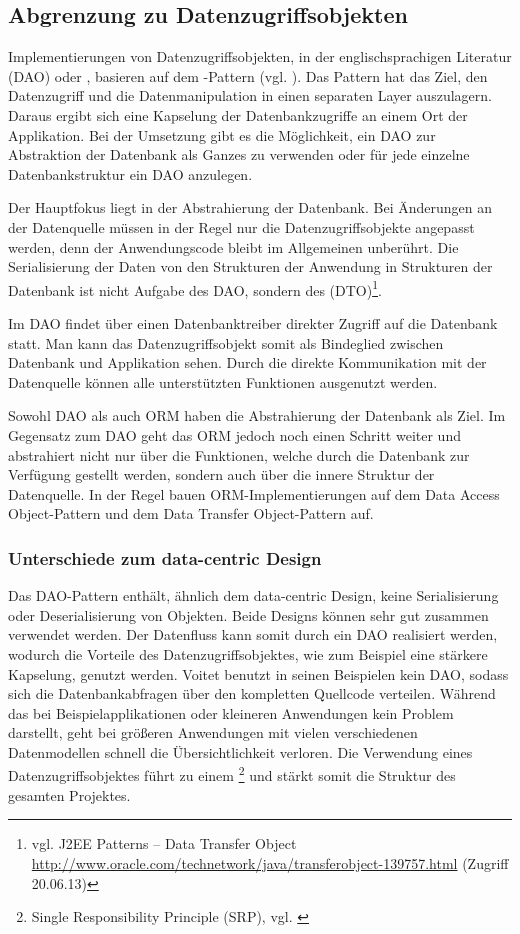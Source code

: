 \subsection{Abgrenzung zu Datenzugriffsobjekten}
Implementierungen von Datenzugriffsobjekten, in der englischsprachigen Literatur  (DAO) oder , basieren auf dem -Pattern (vgl. \cite{j2ee-pattern}).  Das Pattern hat das Ziel, den Datenzugriff und die Datenmanipulation in einen separaten Layer auszulagern. Daraus ergibt sich eine Kapselung der Datenbankzugriffe an einem Ort der Applikation. Bei der Umsetzung gibt es die Möglichkeit, ein DAO zur Abstraktion der Datenbank als Ganzes zu verwenden oder für jede einzelne Datenbankstruktur ein DAO anzulegen.

Der Hauptfokus liegt in der Abstrahierung der Datenbank. Bei Änderungen an der Datenquelle müssen in der Regel nur die Datenzugriffsobjekte angepasst werden, denn der Anwendungscode bleibt im Allgemeinen unberührt. Die Serialisierung der Daten von den Strukturen der Anwendung in Strukturen der Datenbank ist nicht Aufgabe des DAO, sondern des  (DTO)\footnote{vgl. J2EE Patterns – Data Transfer Object \url{http://www.oracle.com/technetwork/java/transferobject-139757.html} (Zugriff 20.06.13)}.

Im DAO findet über einen Datenbanktreiber direkter Zugriff auf die Datenbank statt. Man kann das Datenzugriffsobjekt somit als Bindeglied zwischen Datenbank und Applikation sehen. Durch die direkte Kommunikation mit der Datenquelle können alle unterstützten Funktionen ausgenutzt werden. 

Sowohl DAO als auch ORM haben die Abstrahierung der Datenbank als Ziel. Im Gegensatz zum DAO geht das ORM jedoch noch einen Schritt weiter und abstrahiert nicht nur über die Funktionen, welche durch die Datenbank zur Verfügung gestellt werden, sondern auch über die innere Struktur der Datenquelle. In der Regel bauen ORM-Implementierungen auf dem Data Access Object-Pattern und dem Data Transfer Object-Pattern auf.

\subsubsection{Unterschiede zum data-centric Design}
Das DAO-Pattern enthält, ähnlich dem data-centric Design, keine Serialisierung oder Deserialisierung von Objekten. Beide Designs können sehr gut zusammen verwendet werden. Der Datenfluss kann somit durch ein DAO realisiert werden, wodurch die Vorteile des Datenzugriffsobjektes, wie zum Beispiel eine stärkere Kapselung, genutzt werden. Voitet benutzt in seinen Beispielen kein DAO, sodass sich die Datenbankabfragen über den kompletten Quellcode verteilen. Während das bei Beispielapplikationen oder kleineren Anwendungen kein Problem darstellt, geht bei größeren Anwendungen mit vielen verschiedenen Datenmodellen schnell die Übersichtlichkeit verloren. Die Verwendung eines Datenzugriffsobjektes führt zu einem \footnote{ Single Responsibility Principle (SRP), vgl. \cite[p.~339]{design-patterns}}
 und stärkt somit die Struktur des gesamten Projektes. 

